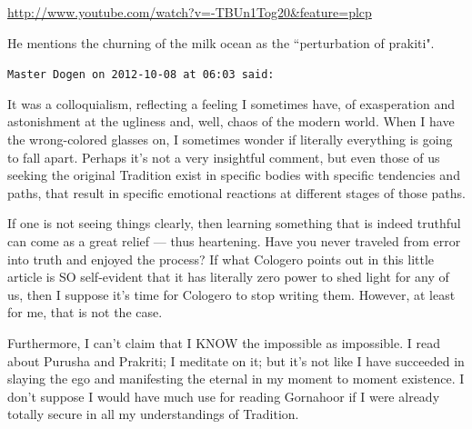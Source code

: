 \begin{footnotesize}
\begin{sffamily}
\url{http://www.youtube.com/watch?v=-TBUn1Tog20\&feature=plcp}

He mentions the churning of the milk ocean as the ``perturbation of prakiti".


\hfill

\texttt{Master Dogen on 2012-10-08 at 06:03 said: }

It was a colloquialism, reflecting a feeling I sometimes have, of exasperation and astonishment at the ugliness and,
well, chaos of the modern world. When I have the wrong-colored glasses on, I sometimes wonder if literally everything
is going to fall apart. Perhaps it's not a very insightful comment, but even those of us seeking
the original Tradition exist in specific bodies with specific tendencies and paths, that result in specific emotional
reactions at different stages of those paths. 

If one is not seeing things clearly, then learning something that is indeed truthful can come as a great relief
— thus heartening. Have you never traveled from error into truth and enjoyed the process? If what
Cologero points out in this little article is SO self-evident that it has literally zero power to shed light for any of
us, then I suppose it's time for Cologero to stop writing them. However, at least for me, that is
not the case.

Furthermore, I can't claim that I KNOW the impossible as impossible. I read about Purusha and
Prakriti; I meditate on it; but it's not like I have succeeded in slaying the ego and manifesting
the eternal in my moment to moment existence. I don't suppose I would have much use for reading
Gornahoor if I were already totally secure in all my understandings of Tradition.


\end{sffamily}\end{footnotesize}
